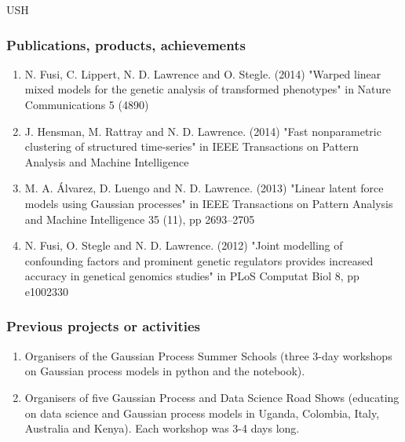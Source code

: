 \begin{sitedescription}{USH}
%

\subsubsection*{Publications, products, achievements}

\begin{enumerate}
\item N. Fusi, C. Lippert, N. D. Lawrence and O. Stegle. (2014) "Warped linear mixed models for the genetic analysis of transformed phenotypes" in Nature Communications 5 (4890)
\item J. Hensman, M. Rattray and N. D. Lawrence. (2014) "Fast nonparametric clustering of structured time-series" in IEEE Transactions on Pattern Analysis and Machine Intelligence
\item M. A. \'Alvarez, D. Luengo and N. D. Lawrence. (2013) "Linear latent force models using Gaussian processes" in IEEE Transactions on Pattern Analysis and Machine Intelligence 35 (11), pp 2693--2705
\item N. Fusi, O. Stegle and N. D. Lawrence. (2012) "Joint modelling of confounding factors and prominent genetic regulators provides increased accuracy in genetical genomics studies" in PLoS Computat Biol 8, pp e1002330
\end{enumerate}

\subsubsection*{Previous projects or activities}

\begin{enumerate}
\item Organisers of the Gaussian Process Summer Schools (three 3-day workshops on Gaussian process models in python and the \IPython notebook).
\item Organisers of five Gaussian Process and Data Science Road Shows (educating on data science and Gaussian process models in Uganda, Colombia, Italy, Australia and Kenya). Each workshop was 3-4 days long.
\end{enumerate}


\end{sitedescription}
